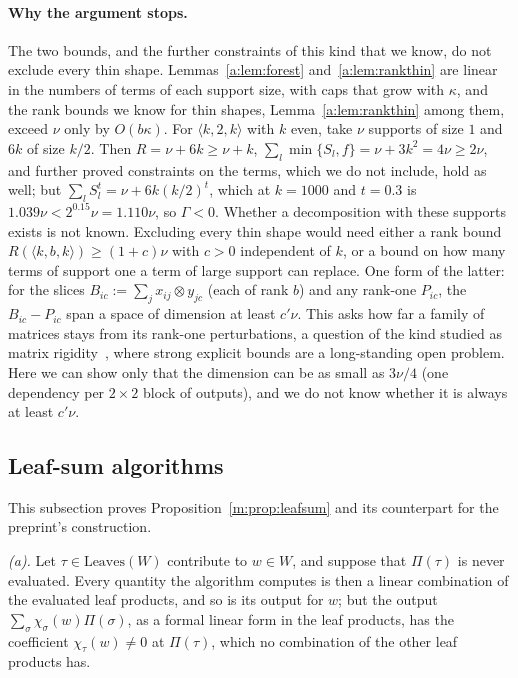 \documentclass[11pt]{article}
\theoremstyle{definition}
\theoremstyle{remark}
\newcommand{\Leaves}{\mathrm{Leaves}}
\begin{document}
\paragraph{Why the argument stops.} The two bounds, and the further constraints of this kind that we know, do not exclude every thin shape. Lemmas~\ref{a:lem:forest} and~\ref{a:lem:rankthin} are linear in the numbers of terms of each support size, with caps that grow with $\kappa$, and the rank bounds we know for thin shapes, Lemma~\ref{a:lem:rankthin} among them, exceed $\nu$ only by $O(b\kappa)$. For $\langle k,2,k\rangle$ with $k$ even, take $\nu$ supports of size $1$ and $6k$ of size $k/2$. Then $R=\nu+6k\ge \nu+k$, $\sum_l\min\{S_l,f\}=\nu+3k^2=4\nu\ge2\nu$, and further proved constraints on the terms, which we do not include, hold as well; but $\sum_lS_l^t=\nu+6k(k/2)^t$, which at $k=1000$ and $t=0.3$ is $1.039\nu<2^{0.15}\nu=1.110\nu$, so $\Gamma<0$. Whether a decomposition with these supports exists is not known. Excluding every thin shape would need either a rank bound $R(\langle k,b,k\rangle)\ge(1+c)\nu$ with $c>0$ independent of $k$, or a bound on how many terms of support one a term of large support can replace. One form of the latter: for the slices $B_{ic}:=\sum_jx_{ij}\otimes y_{jc}$ (each of rank $b$) and any rank-one $P_{ic}$, the $B_{ic}-P_{ic}$ span a space of dimension at least $c'\nu$. This asks how far a family of matrices stays from its rank-one perturbations, a question of the kind studied as matrix rigidity~\cite{Val77}, where strong explicit bounds are a long-standing open problem. Here we can show only that the dimension can be as small as $3\nu/4$ (one dependency per $2\times2$ block of outputs), and we do not know whether it is always at least $c'\nu$.

\subsection{Leaf-sum algorithms}\label{a:sec:leafsum}

This subsection proves Proposition~\ref{m:prop:leafsum} and its counterpart for the preprint's construction.

\emph{(a).} Let $\tau\in\Leaves(W)$ contribute to $w\in W$, and suppose that $\Pi(\tau)$ is never evaluated. Every quantity the algorithm computes is then a linear combination of the evaluated leaf products, and so is its output for $w$; but the output $\sum_\sigma\chi_\sigma(w)\Pi(\sigma)$, as a formal linear form in the leaf products, has the coefficient $\chi_\tau(w)\ne0$ at $\Pi(\tau)$, which no combination of the other leaf products has.
\end{document}
